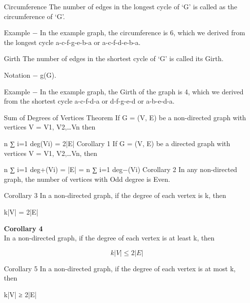 Circumference
The number of edges in the longest cycle of ‘G’ is called as the circumference of ‘G’.

Example − In the example graph, the circumference is 6, which we derived from the longest cycle a-c-f-g-e-b-a or a-c-f-d-e-b-a.

Girth
The number of edges in the shortest cycle of ‘G’ is called its Girth.

Notation − g(G).

Example − In the example graph, the Girth of the graph is 4, which we derived from the shortest cycle a-c-f-d-a or d-f-g-e-d or a-b-e-d-a.

Sum of Degrees of Vertices Theorem
If G = (V, E) be a non-directed graph with vertices V = {V1, V2,…Vn} then

n
∑
i=1
 deg(Vi) = 2|E|
Corollary 1
If G = (V, E) be a directed graph with vertices V = {V1, V2,…Vn}, then

n
∑
i=1
 deg+(Vi) = |E| = 
n
∑
i=1
 deg−(Vi)
Corollary 2
In any non-directed graph, the number of vertices with Odd degree is Even.

Corollary 3
In a non-directed graph, if the degree of each vertex is k, then

k|V| = 2|E|

\textbf{Corollary 4}\\
In a non-directed graph, if the degree of each vertex is at least k, then

\[k|V| ≤ 2|E|\]

Corollary 5
In a non-directed graph, if the degree of each vertex is at most k, then

k|V| ≥ 2|E|



